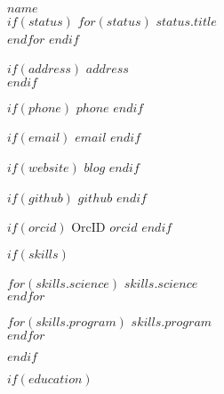 \documentclass[$fontsize$, letterpaper]{article}
\begin{document}
{\Large \textbf{$name$}}\\[.2cm]
$if(status)$
$for(status)$
{\large{$status.title$}} \\
$endfor$
$endif$

\begin{multicols}{3}

\vspace*{.1cm}

$if(address)$
\faHome \quad $address$\\
$endif$

$if(phone)$
\faPhone \quad $phone$
$endif$

$if(email)$
\faEnvelope \quad \href{mailto:$email$}{$email$}
$endif$

$if(website)$
\faGlobe \quad \href{http://$blog$}{$blog$}
$endif$

$if(github)$
\faGithub \quad \href{https://github.com/$github$}{$github$}
$endif$

$if(orcid)$
OrcID \quad \href{http://orcid.org/$orcid$}{$orcid$}
$endif$


$if(skills)$

\columnbreak


\vspace{-.4cm}

\setlength{\columnsep}{0cm}


$for(skills.science)$
$skills.science$\\
$endfor$


\columnbreak

\vspace{-.2cm}

\vspace{-.4cm}



$for(skills.program)$
$skills.program$\\
$endfor$


$endif$
\end{multicols}



$if(education)$

\end{document}
